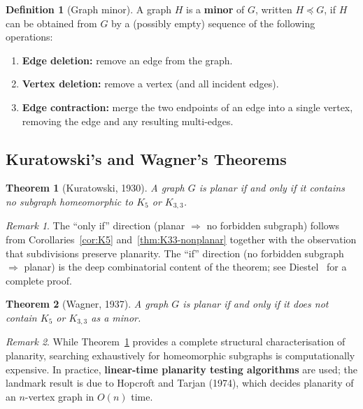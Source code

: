\documentclass[12pt,a4paper]{article}
\theoremstyle{definition}
\newtheorem{definition}{Definition}[section]
\theoremstyle{plain}
\newtheorem{theorem}{Theorem}[section]
\theoremstyle{remark}
\newtheorem{remark}{Remark}[section]
\begin{document}
\begin{definition}[Graph minor]\label{def:minor}
  A graph $H$ is a \textbf{minor} of $G$, written $H \preceq G$, if $H$ can
  be obtained from $G$ by a (possibly empty) sequence of the following
  operations:
  \begin{enumerate}
    \item \textbf{Edge deletion:} remove an edge from the graph.
    \item \textbf{Vertex deletion:} remove a vertex (and all incident edges).
    \item \textbf{Edge contraction:} merge the two endpoints of an edge into a
          single vertex, removing the edge and any resulting multi-edges.
  \end{enumerate}
\end{definition}

\subsection{Kuratowski's and Wagner's Theorems}

\begin{theorem}[Kuratowski, 1930]\label{thm:kuratowski}
  A graph $G$ is planar if and only if it contains no subgraph homeomorphic to
  $K_5$ or $K_{3,3}$.
\end{theorem}

\begin{remark}\label{rem:kuratowski-proof}
  The ``only if'' direction (planar $\Rightarrow$ no forbidden subgraph) follows
  from Corollaries~\ref{cor:K5} and~\ref{thm:K33-nonplanar} together with the
  observation that subdivisions preserve planarity.  The ``if'' direction
  (no forbidden subgraph $\Rightarrow$ planar) is the deep combinatorial content
  of the theorem; see Diestel~\cite{diestel2017} for a complete proof.
\end{remark}

\begin{theorem}[Wagner, 1937]\label{thm:wagner}
  A graph $G$ is planar if and only if it does not contain $K_5$ or $K_{3,3}$
  as a minor.
\end{theorem}

\begin{remark}\label{rem:planarity-algorithms}
  While Theorem~\ref{thm:kuratowski} provides a complete structural
  characterisation of planarity, searching exhaustively for homeomorphic
  subgraphs is computationally expensive.  In practice, \textbf{linear-time
  planarity testing algorithms} are used; the landmark result is due to
  Hopcroft and Tarjan (1974), which decides planarity of an $n$-vertex graph
  in $O(n)$ time.
\end{remark}
\end{document}

